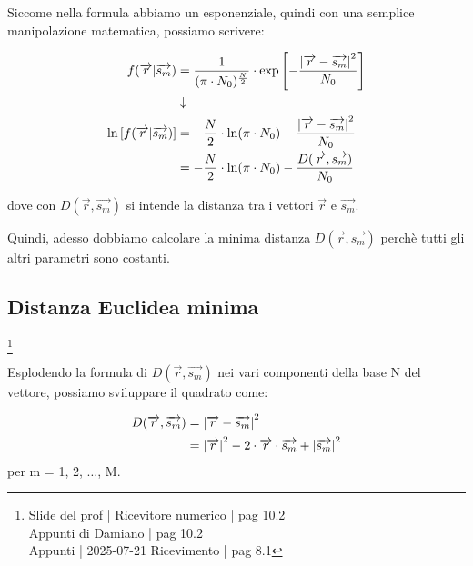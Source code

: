 Siccome nella formula abbiamo un esponenziale, 
quindi con una semplice manipolazione matematica, 
possiamo scrivere: 

{
    \Large 
    \begin{equation}
        \begin{split}
               f(\overrightarrow{r} | \overrightarrow{s_m})
        &=
         \frac{1}{(\pi \cdot N_0)^{\frac{N}{2}}}
        \cdot 
        \exp \left[- \frac{\abs{\overrightarrow{r} - \overrightarrow{s_m}}^{2}}{N_0} \right]
        \\
        &\downarrow
        \\
        \ln 
        \left[
            f(\overrightarrow{r} | \overrightarrow{s_m})
        \right]
        &=
        - \frac{N}{2} 
        \cdot 
        \ln(\pi \cdot N_0)
        - 
        \frac{\abs{\overrightarrow{r} - \overrightarrow{s_m}}^{2}}{N_0}
        \\
        &=
        - \frac{N}{2} 
        \cdot 
        \ln(\pi \cdot N_0)
        - 
        \frac{D(\overrightarrow{r}, \overrightarrow{s_m})}{N_0} 
        \end{split}
    \end{equation}
}

dove con $D(\overrightarrow{r}, \overrightarrow{s_m})$ si intende la distanza 
tra i vettori $\overrightarrow{r}$ e $\overrightarrow{s_m}$. \newline 

Quindi, adesso dobbiamo calcolare la minima distanza 
$D(\overrightarrow{r}, \overrightarrow{s_m})$ perchè tutti gli altri parametri sono costanti. \newline 

\newpage 

\subsection{Distanza Euclidea minima}
\footnote{Slide del prof | Ricevitore numerico | pag 10.2 \\  
Appunti di Damiano | pag 10.2 \\ 
Appunti | 2025-07-21 Ricevimento | pag 8.1
}

Esplodendo la formula di $D(\overrightarrow{r}, \overrightarrow{s_m})$ nei vari componenti della base N del vettore, 
possiamo sviluppare il quadrato come: 

{
    \Large 
    \begin{equation}
        \begin{split}
            D(\overrightarrow{r}, \overrightarrow{s_m}) 
            &= 
            \abs{\overrightarrow{r} - \overrightarrow{s_m}}^{2}
            \\
            &= 
            \abs{\overrightarrow{r}}^{2}
            - 2 \cdot \overrightarrow{r} \cdot \overrightarrow{s_m}
            + 
            \abs{\overrightarrow{s_m}}^{2}
        \end{split} 
    \end{equation}
}
per m = 1, 2, $\dots$, M. \newline 

